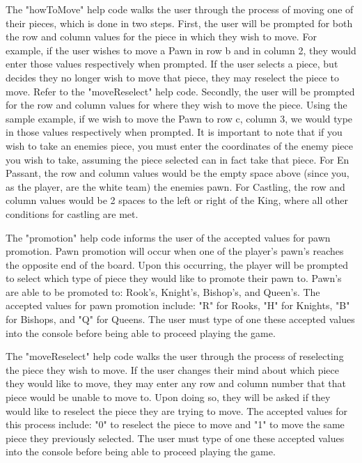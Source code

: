 \documentclass[conference]{IEEEtran}
\begin{document}
The "howToMove" help code walks the user through the process of moving one of their pieces, which is done in two steps. First, the user will be prompted for both the row and column values for the piece in which they wish to move. For example, if the user wishes to move a Pawn in row b and in column 2, they would enter those values respectively when prompted. If the user selects a piece, but decides they no longer wish to move that piece, they may reselect the piece to move. Refer to the "moveReselect" help code. Secondly, the user will be prompted for the row and column values for where they wish to move the piece. Using the sample example, if we wish to move the Pawn to row c, column 3, we would type in those values respectively when prompted. It is important to note that if you wish to take an enemies piece, you must enter the coordinates of the enemy piece you wish to take, assuming the piece selected can in fact take that piece. For En Passant, the row and column values would be the empty space above (since you, as the player, are the white team) the enemies pawn. For Castling, the row and column values would be 2 spaces to the left or right of the King, where all other conditions for castling are met.

The "promotion" help code informs the user of the accepted values for pawn promotion. Pawn promotion will occur when one of the player's pawn's reaches the opposite end of the board. Upon this occurring, the player will be prompted to select which type of piece they would like to promote their pawn to. Pawn's are able to be promoted to: Rook's, Knight's, Bishop's, and Queen's. The accepted values for pawn promotion include: "R" for Rooks, "H" for Knights, "B" for Bishops, and "Q" for Queens. The user must type of one these accepted values into the console before being able to proceed playing the game.

The "moveReselect" help code walks the user through the process of reselecting the piece they wish to move. If the user changes their mind about which piece they would like to move, they may enter any row and column number that that piece would be unable to move to. Upon doing so, they will be asked if they would like to reselect the piece they are trying to move. The accepted values for this process include: "0" to reselect the piece to move and "1" to move the same piece they previously selected. The user must type of one these accepted values into the console before being able to proceed playing the game.
\end{document}
